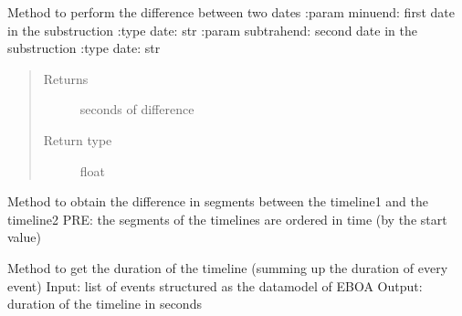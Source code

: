 
\begin{fulllineitems}
\label{\detokenize{eboa.ingestion:eboa.ingestion.functions.dates_difference}}
Method to perform the difference between two dates
:param minuend: first date in the substruction
:type date: str
:param subtrahend: second date in the substruction
:type date: str
\begin{quote}\begin{description}
\item[{Returns}] \leavevmode
seconds of difference

\item[{Return type}] \leavevmode
float

\end{description}\end{quote}

\end{fulllineitems}


\begin{fulllineitems}
\label{\detokenize{eboa.ingestion:eboa.ingestion.functions.difference_timelines}}
Method to obtain the difference in segments between the timeline1 and the timeline2
PRE: the segments of the timelines are ordered in time (by the start value)

\end{fulllineitems}


\begin{fulllineitems}
\label{\detokenize{eboa.ingestion:eboa.ingestion.functions.get_eboa_timeline_duration}}
Method to get the duration of the timeline (summing up the duration of every event)
Input: list of events structured as the datamodel of EBOA
Output: duration of the timeline in seconds

\end{fulllineitems}

